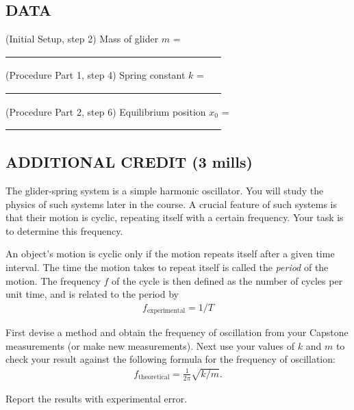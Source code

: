 \begin{enumerate}[label=\arabic*.]
\end{enumerate}

\subsection*{DATA}

\vphantom{.}
\squishlist

\item (Initial Setup, step 2) Mass of glider \(m\) = \ul{~~~~~~~~~~~~~~~~~~~~~~~~~~~~~~~~~~~~~~~~~~~~~}

\item (Procedure Part 1, step 4) Spring constant \(k\) = \ul{~~~~~~~~~~~~~~~~~~~~~~~~~~~~~~~~~~~~~~~~~~~~~}

\item (Procedure Part 2, step 6) Equilibrium position \(x_0\) = \ul{~~~~~~~~~~~~~~~~~~~~~~~~~~~~~~~~~~~~~~~~~~~~~}

\squishend

\subsection*{ADDITIONAL CREDIT (3 mills)}

The glider-spring system is a simple harmonic oscillator.  You will study the physics of such systems later in the course. 
A crucial feature of such systems is that their motion is cyclic,
repeating itself with a certain frequency.  Your task is to determine this frequency.

An object's motion is cyclic only if the motion repeats itself after a given time interval.
The time the motion takes to repeat itself is called the \textit{period} of the motion.
The frequency $f$ of the cycle is then defined as the number of cycles per unit time,
and is related to the period by
\begin{align*} f_\text{experimental} = 1/T \end{align*}

First devise a method and obtain the frequency of oscillation from your Capstone measurements (or make new measurements).
Next use your values of \(k\) and \(m\) to check your result against the following formula for the frequency of oscillation:
\begin{align*} f_\text{theoretical} = \frac{1}{2\pi} \sqrt{k/m}. \end{align*}

Report the results with experimental error.
